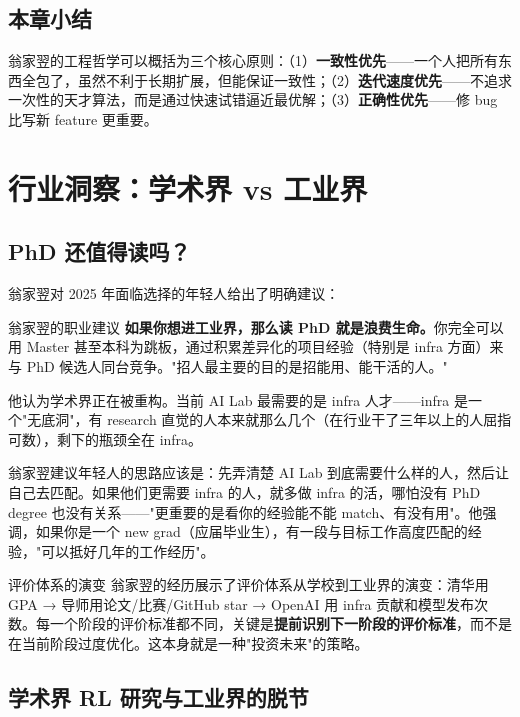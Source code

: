 \documentclass[a4paper]{article}
\begin{document}
\subsection{本章小结}

翁家翌的工程哲学可以概括为三个核心原则：（1）\textbf{一致性优先}——一个人把所有东西全包了，虽然不利于长期扩展，但能保证一致性；（2）\textbf{迭代速度优先}——不追求一次性的天才算法，而是通过快速试错逼近最优解；（3）\textbf{正确性优先}——修 bug 比写新 feature 更重要。


\section{行业洞察：学术界 vs 工业界}

\subsection{PhD 还值得读吗？}

翁家翌对 2025 年面临选择的年轻人给出了明确建议：

\begin{importantbox}{翁家翌的职业建议}
\textbf{如果你想进工业界，那么读 PhD 就是浪费生命。}你完全可以用 Master 甚至本科为跳板，通过积累差异化的项目经验（特别是 infra 方面）来与 PhD 候选人同台竞争。"招人最主要的目的是招能用、能干活的人。"
\end{importantbox}

他认为学术界正在被重构。当前 AI Lab 最需要的是 infra 人才——infra 是一个"无底洞"，有 research 直觉的人本来就那么几个（在行业干了三年以上的人屈指可数），剩下的瓶颈全在 infra。

翁家翌建议年轻人的思路应该是：先弄清楚 AI Lab 到底需要什么样的人，然后让自己去匹配。如果他们更需要 infra 的人，就多做 infra 的活，哪怕没有 PhD degree 也没有关系——"更重要的是看你的经验能不能 match、有没有用"。他强调，如果你是一个 new grad（应届毕业生），有一段与目标工作高度匹配的经验，"可以抵好几年的工作经历"。

\begin{knowledgebox}{评价体系的演变}
翁家翌的经历展示了评价体系从学校到工业界的演变：清华用 GPA → 导师用论文/比赛/GitHub star → OpenAI 用 infra 贡献和模型发布次数。每一个阶段的评价标准都不同，关键是\textbf{提前识别下一阶段的评价标准}，而不是在当前阶段过度优化。这本身就是一种"投资未来"的策略。
\end{knowledgebox}

\subsection{学术界 RL 研究与工业界的脱节}
\end{document}

